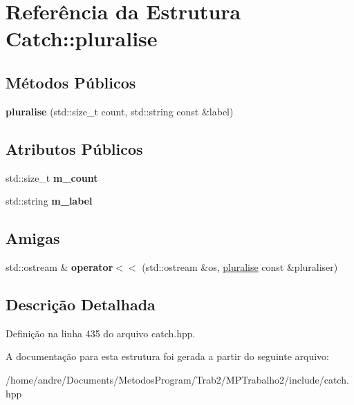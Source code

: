 \hypertarget{structCatch_1_1pluralise}{}\section{Referência da Estrutura Catch\+:\+:pluralise}
\label{structCatch_1_1pluralise}
\subsection*{Métodos Públicos}
\begin{DoxyCompactItemize}
\item 
{\bfseries pluralise} (std\+::size\+\_\+t count, std\+::string const \&label)\hypertarget{structCatch_1_1pluralise_a5c55e22de2416cfe416edf715c6b9234}{}\label{structCatch_1_1pluralise_a5c55e22de2416cfe416edf715c6b9234}

\end{DoxyCompactItemize}
\subsection*{Atributos Públicos}
\begin{DoxyCompactItemize}
\item 
std\+::size\+\_\+t {\bfseries m\+\_\+count}\hypertarget{structCatch_1_1pluralise_a4dce2fa13ec6f00fac09b2418265441e}{}\label{structCatch_1_1pluralise_a4dce2fa13ec6f00fac09b2418265441e}

\item 
std\+::string {\bfseries m\+\_\+label}\hypertarget{structCatch_1_1pluralise_a8849cbdd3f11ebe7747597c8644e8793}{}\label{structCatch_1_1pluralise_a8849cbdd3f11ebe7747597c8644e8793}

\end{DoxyCompactItemize}
\subsection*{Amigas}
\begin{DoxyCompactItemize}
\item 
std\+::ostream \& {\bfseries operator$<$$<$} (std\+::ostream \&os, \hyperlink{structCatch_1_1pluralise}{pluralise} const \&pluraliser)\hypertarget{structCatch_1_1pluralise_aa7dac6b165514c1f85e0695d678fdef5}{}\label{structCatch_1_1pluralise_aa7dac6b165514c1f85e0695d678fdef5}

\end{DoxyCompactItemize}


\subsection{Descrição Detalhada}


Definição na linha 435 do arquivo catch.\+hpp.



A documentação para esta estrutura foi gerada a partir do seguinte arquivo\+:\begin{DoxyCompactItemize}
\item 
/home/andre/\+Documents/\+Metodos\+Program/\+Trab2/\+M\+P\+Trabalho2/include/catch.\+hpp\end{DoxyCompactItemize}
